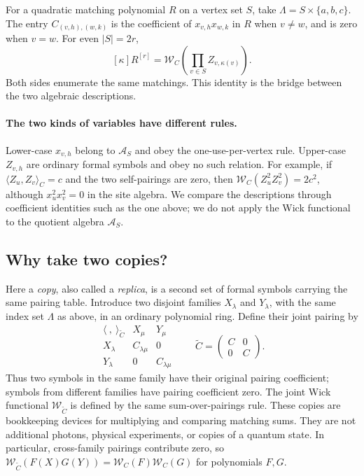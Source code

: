 \documentclass[11pt]{article}
\theoremstyle{definition}
\theoremstyle{plain}
\numberwithin{equation}{section}
\begin{document}
For a quadratic matching polynomial \(R\) on a vertex set \(S\), take
\(\Lambda=S\times\{a,b,c\}\). The entry
\(C_{(v,h),(w,k)}\) is the coefficient of \(x_{v,h}x_{w,k}\) in \(R\)
when \(v\ne w\), and is zero when \(v=w\). For even \(|S|=2r\),
\[
 [\kappa]R^{[r]}
 =\mathcal W_C\!\left(\prod_{v\in S}Z_{v,\kappa(v)}\right).
\]
Both sides enumerate the same matchings. This identity is the bridge
between the two algebraic descriptions.

\paragraph{The two kinds of variables have different rules.}
Lower-case \(x_{v,h}\) belong to \(\mathcal A_S\) and obey the
one-use-per-vertex rule. Upper-case \(Z_{v,h}\) are ordinary formal
symbols and obey no such relation. For example, if
\(\langle Z_u,Z_v\rangle_C=c\) and the two self-pairings are zero, then
\(\mathcal W_C(Z_u^2Z_v^2)=2c^2\), although \(x_u^2x_v^2=0\) in the
site algebra. We compare the descriptions through coefficient identities
such as the one above; we do not apply the Wick functional to the quotient
algebra \(\mathcal A_S\).

\subsection{Why take two copies?}\label{sec:twocopies}

Here a \emph{copy}, also called a \emph{replica}, is a second set of formal
symbols carrying the same pairing table. Introduce two disjoint families
\(X_\lambda\) and \(Y_\lambda\), with the same index set \(\Lambda\)
as above, in an ordinary polynomial ring. Define their joint pairing by
\[
 \begin{array}{c|cc}
  \langle\ ,\ \rangle_{\widetilde C}&X_\mu&Y_\mu\\\hline
  X_\lambda&C_{\lambda\mu}&0\\
  Y_\lambda&0&C_{\lambda\mu}
 \end{array}
 \qquad
 \widetilde C=\begin{pmatrix}C&0\\0&C\end{pmatrix}.
\]
Thus two symbols in the same family have their original pairing coefficient;
symbols from different families have pairing coefficient zero. The joint
Wick functional \(\mathcal W_{\widetilde C}\) is defined by the same
sum-over-pairings rule. These copies are bookkeeping devices for multiplying
and comparing matching sums. They are not additional photons, physical
experiments, or copies of a quantum state.
In particular, cross-family pairings contribute zero, so
\(\mathcal W_{\widetilde C}(F(X)G(Y))
=\mathcal W_C(F)\mathcal W_C(G)\) for polynomials \(F,G\).
\end{document}
